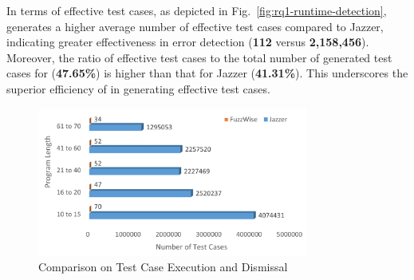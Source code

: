 

In terms of effective test cases, as depicted in
Fig.~\ref{fig:rq1-runtime-detection}, {\tool} generates a higher
average number of effective test cases compared to Jazzer, indicating
greater effectiveness in error detection ({\bf 112} versus {\bf
  2,158,456}). Moreover, the ratio of effective test cases to the total
number of generated test cases for {\tool} ({\bf 47.65\%}) is higher than
that for Jazzer ({\bf 41.31\%}). This underscores the superior efficiency
of {\tool} in generating effective test cases.

\begin{figure}
\begin{center}
\includegraphics[width=3.5in]{RQ1b_Discarded Test Cases.png}
\vspace{-20pt}
\caption{Comparison on Test Case Execution and Dismissal}
\label{fig:rq1-agt-aet-adt-graph}
\end{center}
\end{figure}

